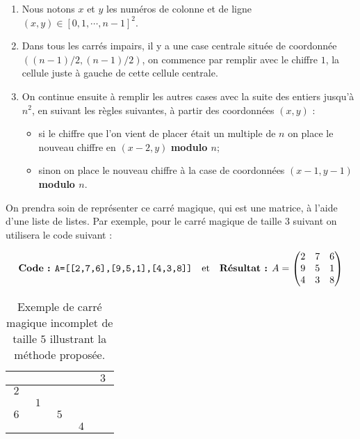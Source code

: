 \begin{enumerate}
	\item Nous notons $x$ et $y$ les numéros de colonne et de ligne $(x,y) \in \left[0,1,\cdots,n-1\right]^2$.
	\item Dans tous les carrés impairs, il y a une case centrale située de coordonnée $((n-1)/2,(n-1)/2)$, on commence par remplir avec le chiffre $1$, la cellule juste à gauche de cette cellule centrale.
\item On continue ensuite à remplir les autres cases avec la suite des entiers jusqu'à $n^2$, en suivant les règles suivantes, à partir des coordonnées $(x,y)$ :
\begin{itemize}
	\item si le chiffre que l'on vient de placer était un multiple de $n$ on place le nouveau chiffre en  $(x-2,y)$ \textbf{modulo $n$};
	\item sinon on place le nouveau chiffre à la case de coordonnées $(x-1,y-1)$ \textbf{modulo $n$}.
\end{itemize}
\end{enumerate}

On prendra soin de représenter ce carré magique, qui est une matrice, à l'aide d'une liste de listes. Par exemple, pour le carré magique de taille 3 suivant on utilisera le code suivant :

	\[\begin{array}{ccc}
	\mbox{\textbf{Code :} \texttt{A=[[2,7,6],[9,5,1],[4,3,8]]}} & \mbox{et} &\mbox{\textbf{Résultat :} } A=\begin{pmatrix}
			2 & 7 & 6 \\ 
			9 & 5 & 1 \\ 
			4 & 3 & 8 
	\end{pmatrix}
	\end{array}
\]

\begin{table}[h]
\renewcommand{\arraystretch}{1.2}
	\centering
		\begin{tabular}{|*{5}{c|}}
			\hline
			 & & & &$~3~$\\
			\hline
			$~2~$& & & & \\
			\hline
			   &$~1~$&   &   &   \\
			\hline
			$~6~$& &$~5~$& & \\
			\hline
			 & & &$~4~$& \\
			\hline
		\end{tabular}
\renewcommand{\arraystretch}{1}
\caption{Exemple de carré magique incomplet de taille $5$ illustrant la méthode proposée.}
\label{Carre5}
\end{table}

